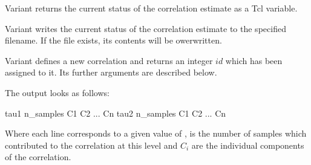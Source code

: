 Variant  returns the current status of the correlation
estimate as a Tcl variable. 

Variant  writes the current status of the correlation
estimate to the specified filename. If the file exists, its contents will
be owerwritten.

Variant  defines a new correlation and returns an integer
$id$ which has been assigned to it. Its further arguments are
described below.


The output looks as follows:
\begin{code}
tau1 n_samples C1 C2 ... Cn
tau2 n_samples C1 C2 ... Cn
\end{code}
Where each line corresponds to a given value of ,  is the number
of samples which contributed to the correlation at this level and $C_i$ are the individual
components of the correlation.


